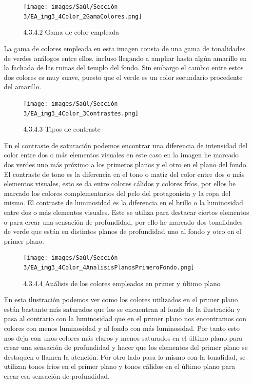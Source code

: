 \documentclass[12pt]{article}
\begin{document}
    \begin{figure}[H]
      \centering
      \texttt{[image: images/Saúl/Sección 3/EA\_img3\_4Color\_2GamaColores.png]}
      \caption{\small 4.3.4.2 Gama de color empleada}
    \end{figure}

La gama de colores empleada en esta imagen consta de una gama de tonalidades de verdes análogos entre ellos, incluso llegando a ampliar hasta algún amarillo en la fachada de las ruinas del templo del fondo. Sin embargo el cambio entre estos dos colores es muy suave, puesto que el verde es un color secundario procedente del amarillo.

    \begin{figure}[H]
      \centering
      \texttt{[image: images/Saúl/Sección 3/EA\_img3\_4Color\_3Contrastes.png]}
      \caption{\small 4.3.4.3 Tipos de contraste}
    \end{figure}

En el contraste de saturación podemos encontrar una diferencia de intensidad del color entre dos o más elementos visuales en este caso en la imagen he marcado dos verdes uno más próximo a los primeros planos y el otro en el plano del fondo. El contraste de tono es la diferencia en el tono o matiz del color entre dos o más elementos visuales, esto se da entre colores cálidos y colores fríos, por ellos he marcado los colores complementarios del pelo del protagonista y la ropa del mismo. El contraste de luminosidad es la diferencia en el brillo o la luminosidad entre dos o más elementos visuales. Este se utiliza para destacar ciertos elementos o para crear una sensación de profundidad, por ello he marcado dos tonalidades de verde que están en distintos planos de profundidad uno al fondo y otro en el primer plano.

    \begin{figure}[H]
      \centering
      \texttt{[image: images/Saúl/Sección 3/EA\_img3\_4Color\_4AnalisisPlanosPrimeroFondo.png]}
      \caption{\small 4.3.4.4 Análisis de los colores empleados en primer y último plano}
    \end{figure}

En esta ilustración podemos ver como los colores utilizados en el primer plano están bastante más saturados que los se encuentran al fondo de la ilustración y pasa al contrario con la luminosidad que en el primer plano nos encontramos con colores con menos luminosidad y al fondo con más luminosidad. Por tanto esto nos deja con unos colores más claros y menos saturados en el último plano para crear una sensación de profundidad y hacer que los elementos del primer plano se destaquen o llamen la atención. Por otro lado pasa lo mismo con la tonalidad, se utilizan tonos fríos en el primer plano y tonos cálidos en el último plano para crear esa sensación de profundidad.
        \newpage
\end{document}
